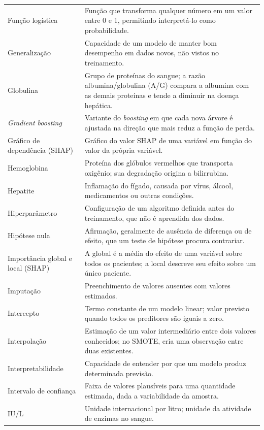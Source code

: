 \begin{longtable}{@{}p{3.8cm}p{10.7cm}@{}}
Função logística & Função que transforma qualquer número em um valor entre 0 e 1, permitindo interpretá-lo como probabilidade. \\[0.15cm]
Generalização & Capacidade de um modelo de manter bom desempenho em dados novos, não vistos no treinamento. \\[0.15cm]
Globulina & Grupo de proteínas do sangue; a razão albumina/globulina (A/G) compara a albumina com as demais proteínas e tende a diminuir na doença hepática. \\[0.15cm]
\textit{Gradient boosting} & Variante do \textit{boosting} em que cada nova árvore é ajustada na direção que mais reduz a função de perda. \\[0.15cm]
Gráfico de dependência (SHAP) & Gráfico do valor SHAP de uma variável em função do valor da própria variável. \\[0.15cm]
Hemoglobina & Proteína dos glóbulos vermelhos que transporta oxigênio; sua degradação origina a bilirrubina. \\[0.15cm]
Hepatite & Inflamação do fígado, causada por vírus, álcool, medicamentos ou outras condições. \\[0.15cm]
Hiperparâmetro & Configuração de um algoritmo definida antes do treinamento, que não é aprendida dos dados. \\[0.15cm]
Hipótese nula & Afirmação, geralmente de ausência de diferença ou de efeito, que um teste de hipótese procura contrariar. \\[0.15cm]
Importância global e local (SHAP) & A global é a média do efeito de uma variável sobre todos os pacientes; a local descreve seu efeito sobre um único paciente. \\[0.15cm]
Imputação & Preenchimento de valores ausentes com valores estimados. \\[0.15cm]
Intercepto & Termo constante de um modelo linear; valor previsto quando todos os preditores são iguais a zero. \\[0.15cm]
Interpolação & Estimação de um valor intermediário entre dois valores conhecidos; no SMOTE, cria uma observação entre duas existentes. \\[0.15cm]
Interpretabilidade & Capacidade de entender por que um modelo produz determinada previsão. \\[0.15cm]
Intervalo de confiança & Faixa de valores plausíveis para uma quantidade estimada, dada a variabilidade da amostra. \\[0.15cm]
IU/L & Unidade internacional por litro; unidade da atividade de enzimas no sangue. \\[0.15cm]

\end{longtable}
